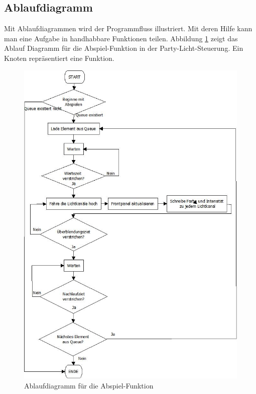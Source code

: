 \subsection{Ablaufdiagramm }
Mit Ablaufdiagrammen wird der Programmfluss illustriert. Mit deren Hilfe kann man eine Aufgabe in handhabbare Funktionen teilen. Abbildung \ref{fig:plan01} zeigt das Ablauf Diagramm für die Abspiel-Funktion in der Party-Licht-Steuerung. Ein Knoten repräsentiert eine Funktion.
	\begin{figure}[h!]
	\centering
		\includegraphics[height=0.72\textheight]{Pics/play-flowchart.jpeg}
	\caption{Ablaufdiagramm für die Abspiel-Funktion}
	\label{fig:plan01}
	\end{figure}	
		
